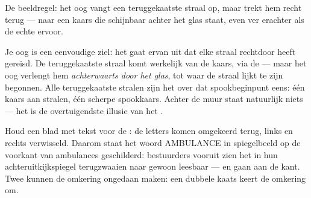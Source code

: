 \begin{omfigure}

{\small De beeldregel: het oog vangt een teruggekaatste straal op, maar
trekt hem recht terug --- naar een kaars die schijnbaar achter het glas
staat, even ver erachter als de echte ervoor.}
\end{omfigure}

\begin{example}\label{ex:g5:mirrors-reflection:why}
Je oog is een eenvoudige ziel: het gaat ervan uit dat elke straal
rechtdoor heeft gereisd. De teruggekaatste straal komt werkelijk van
de kaars, via de  --- maar het oog verlengt hem \emph{achterwaarts
door het glas}, tot waar de straal lijkt te zijn begonnen. Alle
teruggekaatste stralen zijn het over dat spookbeginpunt eens: één
kaars aan stralen, één scherpe spookkaars. Achter de muur staat
natuurlijk niets --- het  is de overtuigendste illusie van het
.
\end{example}

\begin{example}\label{ex:g5:mirrors-reflection:swap}
Houd een blad met tekst voor de : de letters komen omgekeerd
terug, links en rechts verwisseld. Daarom staat het woord AMBULANCE in
spiegelbeeld op de voorkant van ambulances geschilderd: bestuurders
vooruit zien het in hun achteruitkijkspiegel terugzwaaien naar gewoon
leesbaar --- en gaan aan de kant. Twee  kunnen de omkering
ongedaan maken: een dubbele kaats keert de omkering om.
\end{example}

